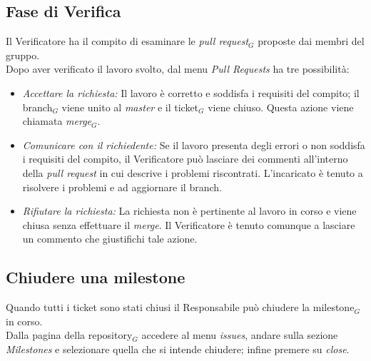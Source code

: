 \subsection{Fase di Verifica}
Il Verificatore ha il compito di esaminare le \textit{pull request}$_{G}$ proposte dai membri del gruppo.\\
Dopo aver verificato il lavoro svolto, dal menu \textit{Pull Requests} ha tre possibilità:
\begin{itemize}
\item \textit{Accettare la richiesta:} Il lavoro è corretto e soddisfa i requisiti del compito; il branch$_{G}$ viene unito al \textit{master} e il ticket$_{G}$ viene chiuso. Questa azione viene chiamata \textit{merge}$_{G}$.
\item \textit{Comunicare con il richiedente:} Se il lavoro presenta degli errori o non soddisfa i requisiti del compito, il Verificatore può lasciare dei commenti all'interno della \textit{pull request} in cui descrive i problemi riscontrati. L'incaricato è tenuto a risolvere i problemi e ad aggiornare il branch.
\item \textit{Rifiutare la richiesta:} La richiesta non è pertinente al lavoro in corso e viene chiusa senza effettuare il \textit{merge}. Il Verificatore è tenuto comunque a lasciare un commento che giustifichi tale azione.
\end{itemize}

\subsection{Chiudere una milestone}
Quando tutti i ticket sono stati chiusi il Responsabile può chiudere la milestone$_{G}$ in corso. \\
Dalla pagina della repository$_{G}$ accedere al menu \textit{issues}, andare sulla sezione \textit{Milestones} e selezionare quella che si intende chiudere; infine premere su \textit{close}.